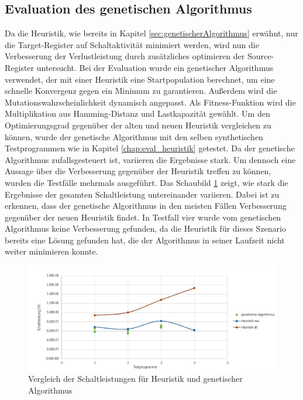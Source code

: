 \subsection{Evaluation des genetischen Algorithmus}
Da die Heuristik, wie bereits in Kapitel \ref{sec:genetischerAlgorithmus} erwähnt, nur die Target-Register auf Schaltaktivität minimiert werden, wird nun die Verbesserung der Verlustleistung durch zusätzliches optimieren der Source-Register untersucht.
Bei der Evaluation wurde ein genetischer Algorithmus verwendet, der mit einer Heuristik eine Startpopulation berechnet, um eine schnelle Konvergenz gegen ein Minimum zu garantieren. Außerdem wird die Mutationswahrscheinlichkeit dynamisch angepasst. Als Fitness-Funktion wird die Multiplikation aus Hamming-Distanz und Lastkapazität gewählt. 
Um den Optimierungsgrad gegenüber der alten und neuen Heuristik vergleichen zu können, wurde der genetische Algorithmus mit den selben synthetischen Testprogrammen wie in Kapitel \ref{chap:eval_heuristik} getestet.
Da der genetische Algorithmus zufallsgesteuert ist, variieren die Ergebnisse stark. Um dennoch eine Aussage über die Verbesserung gegenüber der Heuristik treffen zu können, wurden die Testfälle mehrmals ausgeführt. Das Schaubild  \ref{fig:schaltleistung_genetic_heuristik} zeigt, wie stark die Ergebnisse der gesamten Schaltleistung untereinander variieren. Dabei ist zu erkennen, dass der genetische Algorithmus in den meisten Fällen Verbesserung gegenüber der neuen Heuristik findet. In Testfall vier wurde vom genetischen Algorithmus keine Verbesserung gefunden, da die Heuristik für dieses Szenario bereits eine Lösung gefunden hat, die der Algorithmus in seiner Laufzeit nicht weiter minimieren konnte.  
\begin{figure}[H]
	\centering
	\includegraphics[width=\textwidth]{fig/schaltleistung_genetic_heuristik.pdf}
	\caption{Vergleich der Schaltleistungen für Heuristik und genetischer Algorithmus}
	\label{fig:schaltleistung_genetic_heuristik}
\end{figure}
